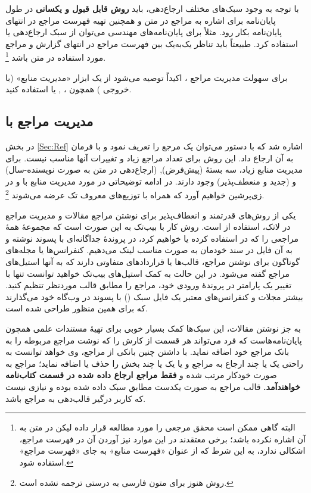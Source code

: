با توجه به وجود سبک‌های مختلف ارجاع‌دهی، باید
\textbf{روش قابل قبول و یکسانی}
در طول پایان‌نامه برای اشاره به مراجع در متن و همچنین تهیه فهرست مراجع در انتهای پایان‌نامه بکار رود. مثلاً برای پایان‌نامه‌های مهندسی می‌توان از سبک ارجاع‌دهی
%
یا
استفاده کرد. طبیعتاً باید تناظر یک‌به‌یک بین فهرست مراجع در انتهای گزارش و مراجع مورد استفاده در متن باشد%
\footnote{البته گاهی ممکن است محقق مرجعی را مورد مطالعه قرار داده لیکن در متن به آن اشاره نکرده باشد؛ برخی معتقدند در این موارد نیز آوردن آن در فهرست مراجع، اشکالی ندارد، به این شرط که از عنوان «فهرست منابع» به جای «فهرست مراجع» استفاده شود.}.

برای سهولت مدیریت مراجع \پ%
، اکیداً توصیه می‌شود از یک ابزار «مدیریت منابع» (با خروجی
\texorpdfstring{}{Bib\TeX}%
) همچون
،
,
یا
استفاده کنید.

\subsection{ مدیریت مراجع با  \texorpdfstring{}{Bib\TeX}}
در بخش \ref{Sec:Ref} اشاره شد که با دستور 
  می‌توان یک مرجع را تعریف نمود و با فرمان
  به آن ارجاع داد. این روش برای تعداد مراجع زیاد و تغییرات آنها مناسب نیست. برای مدیریت منابع زیاد، سه بستهٔ
 (پیش‌فرض),
(ارجاع‌دهی در متن به صورت نویسنده-سال)
و  (جدید و منعطف‌پذیر)
وجود دارند. در ادامه توضیحاتی در مورد مدیریت منابع با  و  در زی‌پرشین خواهیم آورد که همراه با توزیع‌های معروف تک عرضه می‌شوند
\footnote{روش  هنوز برای متون فارسی به درستی ترجمه نشده است.}.

یکی از روش‌های قدرتمند و انعطاف‌پذیر برای نوشتن مراجع مقالات و مدیریت مراجع در لاتک، استفاده از   است.
 روش کار با بیب‌تک به این صورت است که مجموعهٔ همهٔ مراجعی را که در \پ استفاده کرده یا خواهیم کرد، 
در پروندهٔ جداگانه‌ای با پسوند
نوشته و به آن فایل در سند خودمان به صورت مناسب لینک می‌دهیم.
 کنفرانس‌ها یا مجله‌های گوناگون برای نوشتن مراجع، قالب‌ها یا قراردادهای متفاوتی دارند که به آنها استیل‌های مراجع گفته می‌شود.
 در این حالت به کمک ‌استیل‌های بیب‌تک خواهید توانست تنها با تغییر یک پارامتر در پروندهٔ ورودی خود، مراجع را مطابق قالب موردنظر تنظیم کنید. 
 بیشتر مجلات و کنفرانس‌های معتبر یک فایل سبک
 ()
با پسوند  در وب‌گاه خود می‌گذارند که برای همین منظور طراحی شده است.

به جز نوشتن مقالات، این سبک‌ها کمک بسیار خوبی برای تهیهٔ مستندات علمی همچون پایان‌نامه‌هاست که فرد می‌تواند هر قسمت از کارش را که نوشت مراجع مربوطه را به بانک مراجع خود اضافه نماید. با داشتن چنین بانکی از مراجع، وی خواهد توانست به راحتی یک یا چند ارجاع به مراجع و یا یک یا چند بخش را حذف یا اضافه ‌نماید؛ 
مراجع به صورت خودکار مرتب شده و
\textbf{فقط مراجع ارجاع داده شده در قسمت کتاب‌نامه خواهندآمد.}
قالب مراجع به صورت یکدست مطابق سبک داده شده بوده و نیازی نیست که کاربر درگیر قالب‌دهی به مراجع باشد. 


